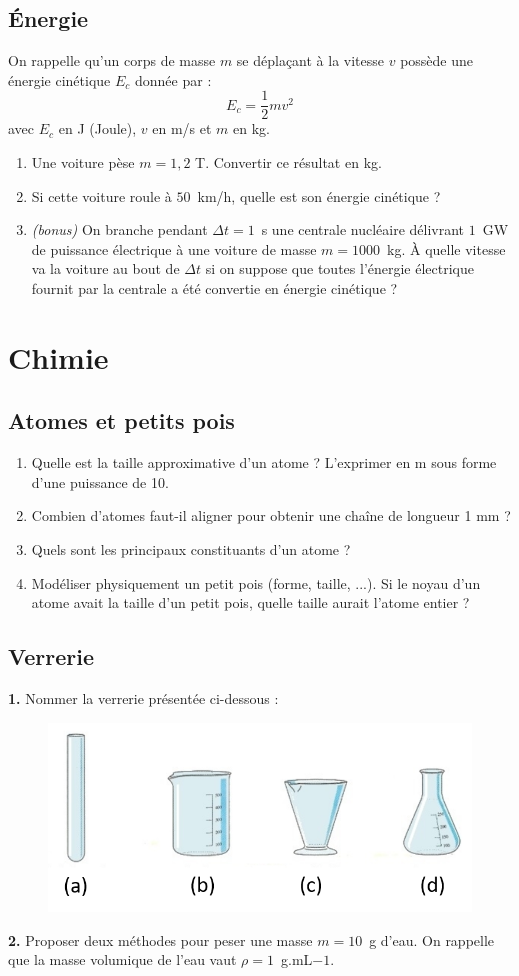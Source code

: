 \subsection{\'{E}nergie}
On rappelle qu’un corps de masse $m$ se déplaçant à la vitesse $v$ possède une énergie cinétique $E_c$ donnée par :
\begin{equation}
    E_c = \frac{1}{2}mv^2
\end{equation}
avec $E_c$ en J (Joule), $v$ en m/s et $m$ en kg.
\begin{enumerate}
    \item Une voiture pèse $m=1,2$ T. Convertir ce résultat en kg.
    \item Si cette voiture roule à $50$~km/h, quelle est son énergie cinétique ?
    \item \textit{(bonus)} On branche pendant $\Delta t =1$~s une centrale nucléaire délivrant $1$~GW de puissance électrique à une voiture de masse $m=1000$~kg. \`{A} quelle vitesse va la voiture au bout de $\Delta t$ si on suppose que toutes l'énergie électrique fournit par la centrale a été convertie en énergie cinétique ?
\end{enumerate}

\section{Chimie}
\subsection{Atomes et petits pois}
\begin{enumerate}
    \item Quelle est la taille approximative d’un atome ? L’exprimer en m sous forme d’une puissance de 10.
    \item Combien d’atomes faut-il aligner pour obtenir une chaîne de longueur 1 mm ?
    \item Quels sont les principaux constituants d’un atome ?
    \item Modéliser physiquement un petit pois (forme, taille, ...). Si le noyau d’un atome avait la taille d’un petit pois, quelle taille aurait l’atome entier ?
\end{enumerate} 

\subsection{Verrerie}
\textbf{1.} Nommer la verrerie présentée ci-dessous :
\begin{figure}[!h]
    \centering
    \includegraphics[scale=0.4]{Revision/Verrerie1.png}
\end{figure}

\textbf{2.} Proposer deux méthodes pour peser une masse $m=10$~g d'eau. On rappelle que la masse volumique de l'eau vaut $\rho=1$~g.mL${-1}$.